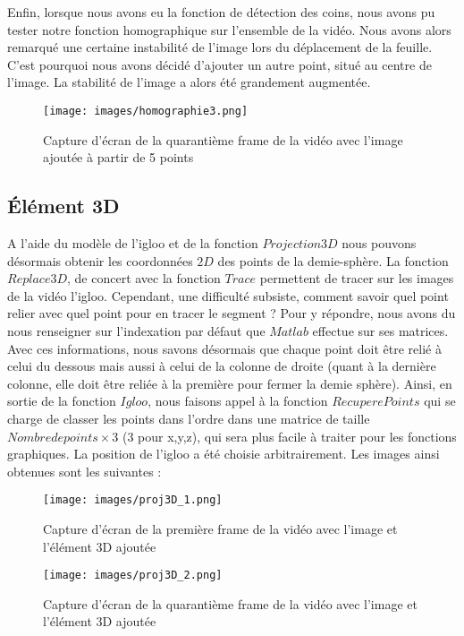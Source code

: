 \documentclass[blue]{ceri/sty/rapport}
\begin{document}
Enfin, lorsque nous avons eu la fonction de détection des coins, nous avons pu tester notre fonction homographique sur l'ensemble de la vidéo. Nous avons alors remarqué une certaine instabilité de l'image lors du déplacement de la feuille. C'est pourquoi nous avons décidé d'ajouter un autre point, situé au centre de l'image. La stabilité de l'image a alors été grandement augmentée.

\begin{figure}[H]
\centering
\texttt{[image: images/homographie3.png]}
\caption[homographie3]{Capture d'écran de la quarantième frame de la vidéo avec l'image ajoutée à partir de 5 points}
\label{fig:homographie2}
\end{figure}



\subsection{Élément 3D}

A l'aide du modèle de l'igloo et de la fonction $Projection3D$ nous pouvons désormais obtenir les coordonnées $2D$ des points de la demie-sphère. La fonction $Replace3D$, de concert avec la fonction $Trace$ permettent de tracer sur les images de la vidéo l'igloo. 
Cependant, une difficulté subsiste, comment savoir quel point relier avec quel point pour en tracer le segment ? 
Pour y répondre, nous avons du nous renseigner sur l'indexation par défaut que $Matlab$ effectue sur ses matrices. Avec ces informations, nous savons désormais que chaque point doit être relié à celui du dessous mais aussi à celui de la colonne de droite (quant à la dernière colonne, elle doit être reliée à la première pour fermer la demie sphère). Ainsi, en sortie de la fonction $Igloo$, nous faisons appel à la fonction $RecuperePoints$ qui se charge de classer les points dans l'ordre dans une matrice de taille $Nombre de points \times 3$ (3 pour x,y,z), qui sera plus facile à traiter pour les fonctions graphiques. La position de l'igloo a été choisie arbitrairement. Les images ainsi obtenues sont les suivantes : 

\begin{figure}[H]
\centering
\texttt{[image: images/proj3D\_1.png]}
\caption[proj3D1]{Capture d'écran de la première frame de la vidéo avec l'image et l'élément 3D ajoutée}
\label{fig:uapv}
\end{figure}

\begin{figure}[H]
\centering
\texttt{[image: images/proj3D\_2.png]}
\caption[proj3D2]{Capture d'écran de la quarantième frame de la vidéo avec l'image et l'élément 3D ajoutée}
\label{fig:uapv}
\end{figure}
\end{document}

